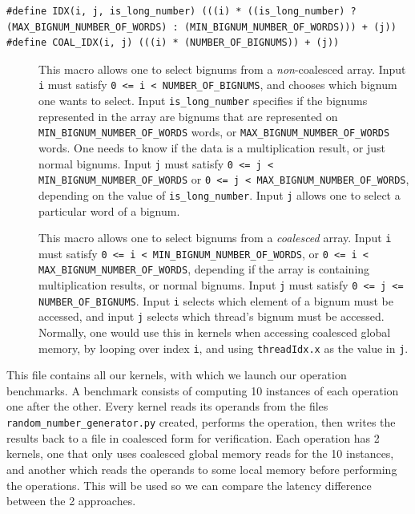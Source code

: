 \documentclass[12pt, a4paper]{report}
\begin{document}
\begin{sloppypar}
\begin{description}
\begin{lstlisting}
#define IDX(i, j, is_long_number) (((i) * ((is_long_number) ? (MAX_BIGNUM_NUMBER_OF_WORDS) : (MIN_BIGNUM_NUMBER_OF_WORDS))) + (j))
#define COAL_IDX(i, j) (((i) * (NUMBER_OF_BIGNUMS)) + (j))
\end{lstlisting}

\begin{description}
\item[] This macro allows one to select bignums
from a \emph{non}-coalesced array.
Input \verb+i+ must satisfy
\verb+0 <= i < NUMBER_OF_BIGNUMS+, and chooses which bignum one wants to select.
Input \verb+is_long_number+ specifies if the bignums represented in the array
are bignums that are represented on \verb+MIN_BIGNUM_NUMBER_OF_WORDS+ words,
or \verb+MAX_BIGNUM_NUMBER_OF_WORDS+ words.
One needs to know if the data is a multiplication result, or just normal
bignums.
Input \verb+j+ must satisfy
\verb+0 <= j < MIN_BIGNUM_NUMBER_OF_WORDS+ or
\verb+0 <= j < MAX_BIGNUM_NUMBER_OF_WORDS+, depending on the value of
\verb+is_long_number+.
Input \verb+j+ allows one to select a particular word of a bignum.

\item[] This macro allows one to select bignums from a
\emph{coalesced} array.
Input \verb+i+ must satisfy \verb+0 <= i < MIN_BIGNUM_NUMBER_OF_WORDS+, or
\verb+0 <= i < MAX_BIGNUM_NUMBER_OF_WORDS+, depending if the array is containing
multiplication results, or normal bignums.
Input \verb+j+ must satisfy \verb+0 <= j <= NUMBER_OF_BIGNUMS+.
Input \verb+i+ selects which element of a bignum must be accessed, and input
\verb+j+ selects which thread's bignum must be accessed.
Normally, one would use this in kernels when accessing coalesced global memory,
by looping over index \verb+i+, and using \verb+threadIdx.x+ as the value in
\verb+j+.
\end{description}

\item[\Q{benchmarks.cu}]
This file contains all our kernels, with which we launch our operation
benchmarks.
A benchmark consists of computing 10 instances of each operation one after the
other.
Every kernel reads its operands from the files \verb+random_number_generator.py+
created, performs the operation, then writes the results back to a file in
coalesced form for verification.
Each operation has 2 kernels, one that only uses coalesced global memory reads
for the 10 instances, and another which reads the operands to some local memory
before performing the operations.
This will be used so we can compare the latency difference between the 2
approaches.


\end{description}
\end{sloppypar}
\end{document}
